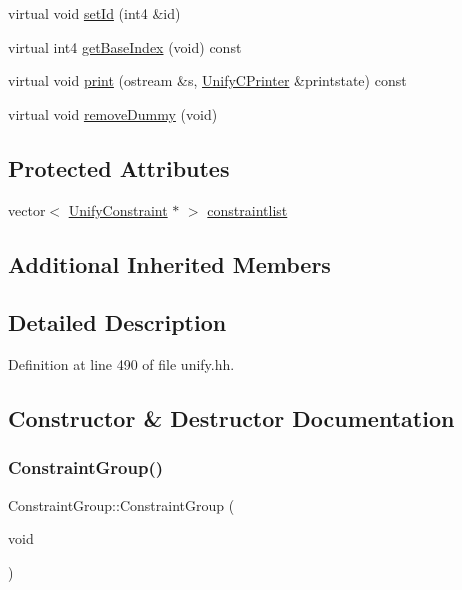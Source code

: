 \begin{DoxyCompactItemize}
\item 
virtual void \mbox{\hyperlink{class_constraint_group_a89e8251b6b4ed3c291cf1503531fac20}{set\+Id}} (int4 \&id)
\item 
virtual int4 \mbox{\hyperlink{class_constraint_group_a50158935682afb1c1838a2d284f18ed4}{get\+Base\+Index}} (void) const
\item 
virtual void \mbox{\hyperlink{class_constraint_group_abd3b88e44acf00941042c9a29d4d32fb}{print}} (ostream \&s, \mbox{\hyperlink{class_unify_c_printer}{Unify\+C\+Printer}} \&printstate) const
\item 
virtual void \mbox{\hyperlink{class_constraint_group_adf801a2e01c28608fcf7c19305cbb08b}{remove\+Dummy}} (void)
\end{DoxyCompactItemize}
\subsection*{Protected Attributes}
\begin{DoxyCompactItemize}
\item 
vector$<$ \mbox{\hyperlink{class_unify_constraint}{Unify\+Constraint}} $\ast$ $>$ \mbox{\hyperlink{class_constraint_group_a218d57fd50d3fadda182398b09c59715}{constraintlist}}
\end{DoxyCompactItemize}
\subsection*{Additional Inherited Members}


\subsection{Detailed Description}


Definition at line 490 of file unify.\+hh.



\subsection{Constructor \& Destructor Documentation}
\mbox{\label{class_constraint_group_a8220351caa63e9d91d7b9cf1efdb7767}} 
\subsubsection{\texorpdfstring{ConstraintGroup()}{ConstraintGroup()}}
{\footnotesize\ttfamily Constraint\+Group\+::\+Constraint\+Group (\begin{DoxyParamCaption}\item[{void}]{ }\end{DoxyParamCaption})}

